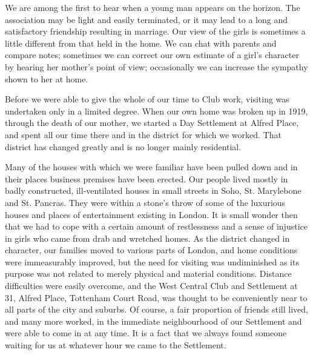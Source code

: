 We are among the first to hear when a young man
appears on the horizon. The association may be light and
easily terminated, or it may lead to a long and satisfactory
friendship resulting in marriage. Our view of the girls
is sometimes a little different from that held in the
home. We can chat with parents and compare notes;
sometimes we can correct our own estimate of a girl’s
character by hearing her mother’s point of view; occasionally
we can increase the sympathy shown to her at
home.

Before we were able to give the whole of our time to
Club work, visiting was undertaken only in a limited
degree. When our own home was broken up in 1919,
through the death of our mother, we started a Day Settlement
at Alfred Place, and spent all our time there and in
the district for which we worked. That district has
changed greatly and is no longer mainly residential.

Many of the houses with which we were familiar have
been pulled down and in their places business premises
have been erected. Our people lived mostly in badly constructed,
ill-ventilated houses in small streets in Soho, St.
Marylebone and St. Pancras. They were within a stone’s
throw of some of the luxurious houses and places of entertainment
existing in London. It is small wonder then that
we had to cope with a certain amount of restlessness and
a sense of injustice in girls who came from drab and
wretched homes. As the district changed in character,
our families moved to various parts of London, and home
conditions were immeasurably improved, but the need for
visiting was undiminished as its purpose was not related
to merely physical and material conditions. Distance difficulties
were easily overcome, and the West Central Club
and Settlement at 31, Alfred Place, Tottenham Court
Road, was thought to be conveniently near to all parts of
the city and suburbs. Of course, a fair proportion of
friends still lived, and many more worked, in the immediate
neighbourhood of our Settlement and were able
to come in at any time. It is a fact that we always found
someone waiting for us at whatever hour we came to the
Settlement.

